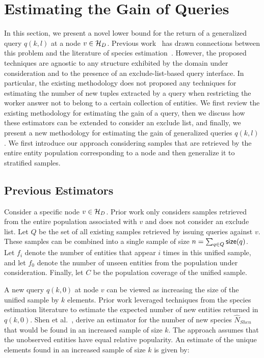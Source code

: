 \section{Estimating the Gain of Queries}
\label{sec:gainestimators}
In this section, we present a novel lower bound for the return of a generalized query $q(k,l)$ at a node $v \in \mathcal{H}_D$. Previous work~\cite{trushkowsky:2013} has drawn connections between this problem and the literature of species estimation~\cite{chao:1992}. However,  the proposed techniques are agnostic to any structure exhibited by the domain under consideration and to the presence of an exclude-list-based query interface. In particular, the existing methodology does not proposed any techniques for estimating the number of new tuples extracted by a query when restricting the worker answer not to belong to a certain collection of entities. We first review the existing methodology for estimating the gain of a query, then we discuss how these estimators can be extended to consider an exclude list, and finally, we present a new methodology for estimating the gain of generalized queries $q(k,l)$. We first introduce our approach considering samples that are retrieved by the entire entity population corresponding to a node and then generalize it to stratified samples.

\subsection{Previous Estimators} 
Consider a specific node $v \in \mathcal{H}_D$. Prior work only considers samples retrieved from the entire population associated with $v$ and does not consider an exclude list. Let $Q$ be the set of all existing samples retrieved by issuing queries against $v$. These samples can be combined into a single sample of size $n = \sum_{q \in Q} {\sf size}(q)$. Let $f_i$ denote the number of entities that appear $i$ times in this unified sample, and let $f_0$ denote the number of unseen entities from the population under consideration. Finally, let $C$ be the population coverage of the unified sample.

A new query $q(k,0)$ at node $v$ can be viewed as increasing the size of the unified sample by $k$ elements. Prior work leveraged techniques from the species estimation literature to estimate the expected number of new entities returned in $q(k,0)$. Shen et al.~\cite{shen:2003}, derive an estimator for the number of new species $\hat{N}_{Shen}$ that would be found in an increased sample of size $k$. The approach assumes that the unobserved entities have equal relative popularity. An estimate of the unique elements found in an increased sample of size $k$ is given by:

